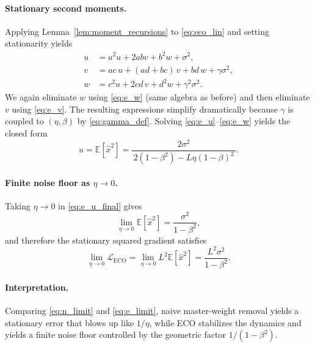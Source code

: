 \documentclass[11pt, a4paper, onecolumn, copyright, goog]{google}
\newcommand{\E}{\mathbb{E}}
\theoremstyle{plain}
\theoremstyle{definition}
\theoremstyle{remark}
\begin{document}
\paragraph{Stationary second moments.}
Applying Lemma~\ref{lem:moment_recursions} to \eqref{eq:eco_lin} and setting stationarity yields
\begin{align}
    u &= a^2 u + 2ab v + b^2 w + \sigma^2, \label{eq:e_u}\\
    v &= ac\,u + (ad+bc)\,v + bd\,w + \gamma\sigma^2, \label{eq:e_v}\\
    w &= c^2 u + 2cd\,v + d^2 w + \gamma^2\sigma^2. \label{eq:e_w}
\end{align}
We again eliminate $w$ using \eqref{eq:e_w} (same algebra as before) and then eliminate $v$ using \eqref{eq:e_v}.
The resulting expressions simplify dramatically because $\gamma$ is coupled to $(\eta,\beta)$ by \eqref{eq:gamma_def}.
Solving \eqref{eq:e_u}--\eqref{eq:e_w} yields the closed form
\begin{equation}
\label{eq:e_u_final}
    u=\E[\hat x^2]
    =
    \frac{2\sigma^2}{\,2(1-\beta^2)-L\eta(1-\beta)^2\,}.
\end{equation}

\paragraph{Finite noise floor as $\eta\to 0$.}
Taking $\eta\to 0$ in \eqref{eq:e_u_final} gives
\begin{equation}
\label{eq:e_limit_u}
    \lim_{\eta\to 0}\E[\hat x^2]=\frac{\sigma^2}{1-\beta^2},
\end{equation}
and therefore the stationary squared gradient satisfies
\begin{equation}
\label{eq:e_limit}
    \lim_{\eta\to 0}\mathcal L_{\mathrm{ECO}}
    = \lim_{\eta\to 0} L^2\E[\hat x^2]
    = \frac{L^2\sigma^2}{1-\beta^2}.
\end{equation}

\paragraph{Interpretation.}
Comparing \eqref{eq:n_limit} and \eqref{eq:e_limit}, naive master-weight removal yields a stationary error that blows up
like $1/\eta$, while ECO stabilizes the dynamics and yields a finite noise floor controlled by the geometric factor
$1/(1-\beta^2)$.
\end{document}
